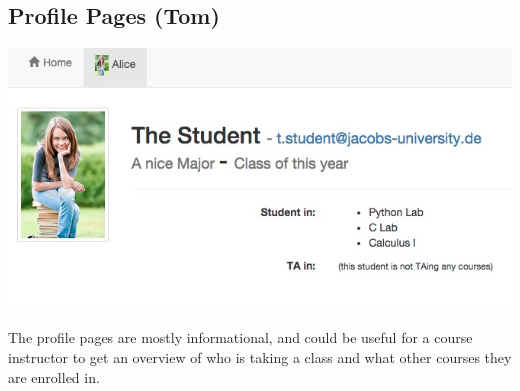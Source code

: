 \subsection{Profile Pages (Tom)}

\includegraphics[width=\textwidth]{screenshots/StudentProfile.jpg}

The profile pages are mostly informational, and could be useful for a course instructor to get an overview of who is taking a class and what other courses they are enrolled in.
